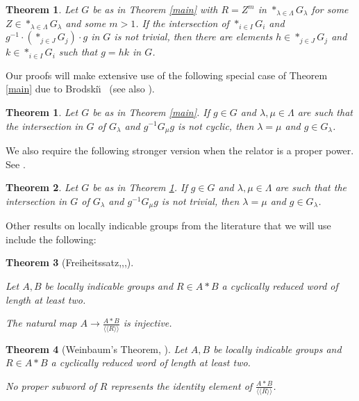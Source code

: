 \documentclass[12pt,a4paper]{amsart}
\def\<{\langle}
\def\>{\rangle}
\newtheorem{thmA}{Theorem}
\newtheorem{thm}{Theorem}[section]
\begin{document}
\begin{thmA}\label{maintorsion}
	Let $G$ be as in Theorem \ref{main} with $R=Z^m$ in $\ast_{\lambda\in\Lambda} G_\lambda$ for some $Z\in \ast_{\lambda\in\Lambda} G_\lambda$ and some $m>1$. If the intersection of $\ast_{i\in I} G_i$ and 
	$g^{-1}\cdot\left(\ast_{j\in J} G_j\right)\cdot g$
	in $G$ is not trivial, then there are elements $h\in \ast_{j\in J} G_j$ and $k\in \ast_{i\in I} G_i$ such that $g=hk$ in $G$.
\end{thmA}

Our proofs will make extensive use of the following special case of Theorem \ref{main} due to Brodski\u\i\ \cite[Theorem 6]{B81} (see also \cite[Theorem F]{HS}).

\begin{thm}\label{BrodskyLemma}
	Let $G$ be as in Theorem \ref{main}.  If $g\in G$ and $\lambda,\mu\in\Lambda$ are such that the intersection in $G$ of $G_\lambda$ and $g^{-1}G_\mu g$ is not cyclic, then $\lambda=\mu$ and $g\in G_\lambda$.
\end{thm}

We also require the following stronger version when the relator is a proper power.  See \cite[Corollary 3.7]{HS}.

\begin{thm}\label{BrodskyTorsion}
	Let $G$ be as in Theorem \ref{maintorsion}.  If $g\in G$ and $\lambda,\mu\in\Lambda$ are such that the intersection in $G$ of $G_\lambda$ and $g^{-1}G_\mu g$ is not trivial, then $\lambda=\mu$ and $g\in G_\lambda$.
\end{thm}

Other results on locally indicable groups from the literature that we will use include the following:


\begin{thm}[Freiheitssatz,\cite{B80},\cite{H81},\cite{S81}]\label{Freiheitssatz}
	
	Let $A,B$ be locally indicable groups and $R\in A*B$ 
	a cyclically reduced word of length at least two. 
	
	The  natural map $A\to \frac{A*B}{\<\< R\>\>}$ is injective.	
\end{thm}

\begin{thm}[Weinbaum's Theorem, \cite{H82}]\label{Weinbaum}
	Let $A,B$ be locally indicable groups and $R\in A*B$ 
	a cyclically reduced word of length at least two. 
	
	No proper subword of $R$ represents the identity element of $\frac{A*B}{\<\< R\>\>}$. 
	
\end{thm} 
\end{document}
